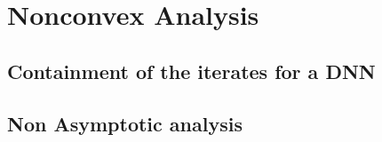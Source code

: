 \documentclass[11pt]{article}
\theoremstyle{k}
\begin{document}
\section{Nonconvex Analysis}

\subsection{Containment of the iterates for a DNN}
\subsection{Non Asymptotic analysis}

\newpage






\end{document}
